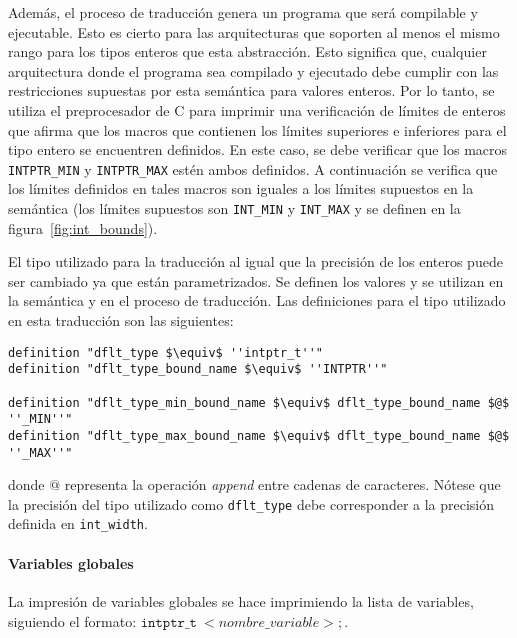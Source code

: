 Además, el proceso de traducción genera un programa que será compilable y ejecutable.
Esto es cierto para las arquitecturas que soporten al menos el mismo rango para los tipos enteros que esta abstracción.
Esto significa que, cualquier arquitectura donde el programa sea compilado y ejecutado debe cumplir con las restricciones supuestas por esta semántica para valores enteros.
Por lo tanto, se utiliza el preprocesador de C para imprimir una verificación de límites de enteros que afirma que los macros que contienen los límites superiores e inferiores para el tipo entero se encuentren definidos.
En este caso, se debe verificar que los macros \verb|INTPTR_MIN| y \verb|INTPTR_MAX| estén ambos definidos.
A continuación se verifica que los límites definidos en tales macros son iguales a los límites supuestos en la semántica (los límites supuestos son \verb|INT_MIN| y \verb|INT_MAX| y se definen en la figura~\ref{fig:int_bounds}).


El tipo utilizado para la traducción al igual que la precisión de los enteros puede ser cambiado ya que están parametrizados.
Se definen los valores y se utilizan en la semántica y en el proceso de traducción.
Las definiciones para el tipo utilizado en esta traducción son las siguientes:

\begin{lstlisting}[frame=single, mathescape=true]
definition "dflt_type $\equiv$ ''intptr_t''"
definition "dflt_type_bound_name $\equiv$ ''INTPTR''"

definition "dflt_type_min_bound_name $\equiv$ dflt_type_bound_name $@$ ''_MIN''"
definition "dflt_type_max_bound_name $\equiv$ dflt_type_bound_name $@$ ''_MAX''"
\end{lstlisting}

donde $@$ representa la operación \textit{append} entre cadenas de caracteres.
Nótese que la precisión del tipo utilizado como \verb|dflt_type| debe corresponder a la precisión definida en \verb|int_width|.

\paragraph*{Variables globales}

La impresión de variables globales se hace imprimiendo la lista de variables, siguiendo el formato: $\mathtt{intptr\_t}\ <nombre\_variable>;$.

\begin{comment}
\begin{equation*}
\begin{split}
& \mathtt{intptr\_t}\ <variable\_name_0>; \\
& \vdots \\
& \mathtt{intptr\_t}\ <variable\_name_n>; \\
\end{split}
\end{equation*}
\end{comment}

